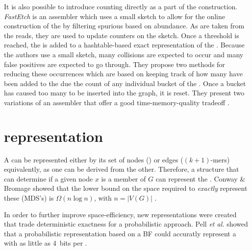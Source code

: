 {It is also possible to introduce \kmer counting directly as a part of the \dBG construction. \emph{FastEtch} is an assembler which uses a small \cm sketch to allow for the online construction of the \dBG by filtering spurious  based on abundance. As  are taken from the reads, they are used to update counters on the \cm sketch. Once a threshold is reached, the \kmer is added to a hashtable-based exact representation of the \dBG. Because the authors use a small \cm sketch, many collisions are expected to occur and many false positives are expected to go through. They propose two methods for reducing these occurrences which are based on keeping track of how many  have been added to the \dBG due the count of any individual bucket of the \cm. Once a bucket has caused too many  to be inserted into the graph, it is reset. They present two variations of an assembler that offer a good time-memory-quality tradeoff \cite{Ghosh2019}.}

\section{\dBG representation}
\label{subsec:dBG-representation}

A \dBG can be represented either by its set of nodes () or edges ($(k+1)$-mers) equivalently, as one can be derived from the other. Therefore, a structure that can determine if a given node $x$ is a member of $G$ can represent the \dBG. Conway \& Bromage showed that the lower bound on the space required to \emph{exactly} represent these  (MDS's) is $\Omega(n \log n)$, with $n=|V(G)|$ \cite{Conway2011}. 

In order to further improve space-efficiency, new representations were created that trade deterministic exactness for a probabilistic approach. Pell \emph{et al.} showed that a probabilistic representation based on a BF could accuratly represent a \dBG with as little as 4~bits per \kmer {} \cite{Pell2012}.

